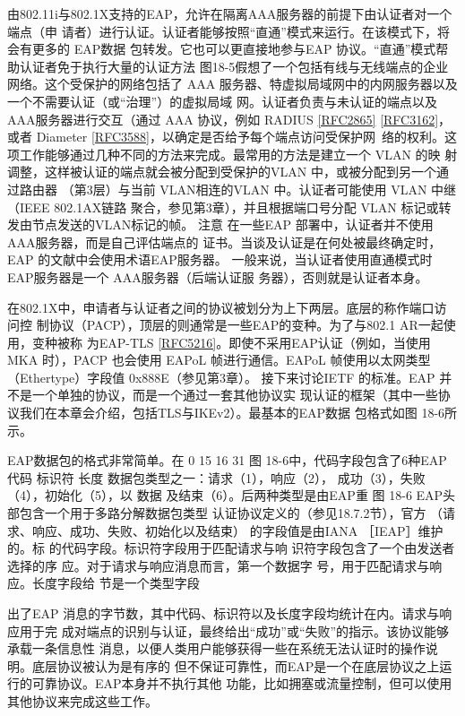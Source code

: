 由802.11i与802.1X支持的EAP，允许在隔离AAA服务器的前提下由认证者对一个端点（申
请者）进行认证。认证者能够按照“直通”模式来运行。在该模式下，将会有更多的 EAP数据
包转发。它也可以更直接地参与EAP 协议。“直通”模式帮助认证者免于执行大量的认证方法
图18-5假想了一个包括有线与无线端点的企业网络。这个受保护的网络包括了 AAA
服务器、特虚拟局域网中的内网服务器以及一个不需要认证（或“治理”）的虚拟局域
网。认证者负责与未认证的端点以及 AAA服务器进行交互（通过 AAA 协议，例如 RADIUS
\href{https://www.rfc-editor.org/rfc/rfc2865}{[RFC2865]} \href{https://www.rfc-editor.org/rfc/rfc3162}{[RFC3162]}，或者 Diameter \href{https://www.rfc-editor.org/rfc/rfc3588}{[RFC3588]}，以确定是否给予每个端点访问受保护网\
络的权利。这项工作能够通过几种不同的方法来完成。最常用的方法是建立一个 VLAN 的映
射调整，这样被认证的端点就会被分配到受保护的VLAN 中，或被分配到另一个通过路由器
（第3层）与当前 VLAN相连的VLAN 中。认证者可能使用 VLAN 中继（IEEE 802.1AX链路
聚合，参见第3章），并且根据端口号分配 VLAN 标记或转发由节点发送的VLAN标记的帧。
注意 在一些EAP 部署中，认证者并不使用AAA服务器，而是自己评估端点的
证书。当谈及认证是在何处被最终确定时，EAP 的文献中会使用术语EAP服务器。
一般来说，当认证者使用直通模式时 EAP服务器是一个 AAA服务器（后端认证服
务器），否则就是认证者本身。

在802.1X中，申请者与认证者之间的协议被划分为上下两层。底层的称作端口访问控
制协议（PACP），顶层的则通常是一些EAP的变种。为了与802.1 AR一起使用，变种被称
为EAP-TLS \href{https://www.rfc-editor.org/rfc/rfc5216}{[RFC5216]}。即使不采用EAP认证（例如，当使用MKA 时），PACP 也会使用
EAPoL 帧进行通信。EAPoL 帧使用以太网类型（Ethertype）字段值 0x888E（参见第3章）。
接下来讨论IETF 的标准。EAP 并不是一个单独的协议，而是一个通过一套其他协议实
现认证的框架（其中一些协议我们在本章会介绍，包括TLS与IKEv2）。最基本的EAP数据
包格式如图 18-6所示。

EAP数据包的格式非常简单。在
0
15 16
31
图 18-6中，代码字段包含了6种EAP
代码
标识符
长度
数据包类型之一：请求（1），响应（2），
成功（3），失败（4），初始化（5），以
数据
及结束（6）。后两种类型是由EAP重
图 18-6
EAP头部包含一个用于多路分解数据包类型
认证协议定义的（参见18.7.2节），官方
（请求、响应、成功、失败、初始化以及结束）
的字段值是由IANA ［IEAP］维护的。标
的代码字段。标识符字段用于匹配请求与响
识符字段包含了一个由发送者选择的序
应。对于请求与响应消息而言，第一个数据字
号，用于匹配请求与响应。长度字段给
节是一个类型字段

出了EAP 消息的字节数，其中代码、标识符以及长度字段均统计在内。请求与响应用于完
成对端点的识别与认证，最终给出“成功”或“失败”的指示。该协议能够承载一条信息性
消息，以便人类用户能够获得一些在系统无法认证时的操作说明。底层协议被认为是有序的
但不保证可靠性，而EAP是一个在底层协议之上运行的可靠协议。EAP本身并不执行其他
功能，比如拥塞或流量控制，但可以使用其他协议来完成这些工作。

